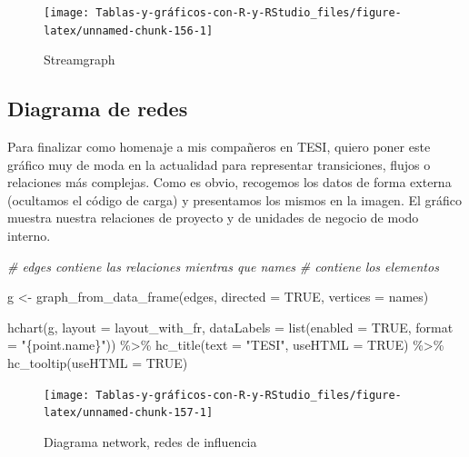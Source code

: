 \documentclass[
]{book}
\newenvironment{Shaded}{\begin{snugshade}}{\end{snugshade}}
\newcommand{\AttributeTok}[1]{\textcolor[rgb]{0.77,0.63,0.00}{#1}}
\newcommand{\CommentTok}[1]{\textcolor[rgb]{0.56,0.35,0.01}{\textit{#1}}}
\newcommand{\ConstantTok}[1]{\textcolor[rgb]{0.00,0.00,0.00}{#1}}
\newcommand{\FunctionTok}[1]{\textcolor[rgb]{0.00,0.00,0.00}{#1}}
\newcommand{\NormalTok}[1]{#1}
\newcommand{\OtherTok}[1]{\textcolor[rgb]{0.56,0.35,0.01}{#1}}
\newcommand{\SpecialCharTok}[1]{\textcolor[rgb]{0.00,0.00,0.00}{#1}}
\newcommand{\StringTok}[1]{\textcolor[rgb]{0.31,0.60,0.02}{#1}}
\begin{document}
\begin{figure}[H]

{\centering \texttt{[image: Tablas-y-gráficos-con-R-y-RStudio\_files/figure-latex/unnamed-chunk-156-1]} 

}

\caption{Streamgraph}\label{fig:unnamed-chunk-156}
\end{figure}

\hypertarget{diagrama-de-redes}{%
\subsection{Diagrama de redes}\label{diagrama-de-redes}}

Para finalizar como homenaje a mis compañeros en TESI, quiero poner este gráfico muy de moda en la actualidad para representar transiciones, flujos o relaciones más complejas. Como es obvio, recogemos los datos de forma externa (ocultamos el código de carga) y presentamos los mismos en la imagen. El gráfico muestra nuestra relaciones de proyecto y de unidades de negocio de modo interno.

\begin{Shaded}
\begin{Highlighting}[]
\CommentTok{\# edges contiene las relaciones mientras que names}
\CommentTok{\# contiene los elementos}

\NormalTok{g }\OtherTok{\textless{}{-}} \FunctionTok{graph\_from\_data\_frame}\NormalTok{(edges, }\AttributeTok{directed =} \ConstantTok{TRUE}\NormalTok{, }\AttributeTok{vertices =}\NormalTok{ names)}

\FunctionTok{hchart}\NormalTok{(g, }\AttributeTok{layout =}\NormalTok{ layout\_with\_fr, }\AttributeTok{dataLabels =} \FunctionTok{list}\NormalTok{(}\AttributeTok{enabled =} \ConstantTok{TRUE}\NormalTok{, }
  \AttributeTok{format =} \StringTok{"\{point.name\}"}\NormalTok{)) }\SpecialCharTok{\%\textgreater{}\%} \FunctionTok{hc\_title}\NormalTok{(}\AttributeTok{text =} \StringTok{"TESI"}\NormalTok{, }
  \AttributeTok{useHTML =} \ConstantTok{TRUE}\NormalTok{) }\SpecialCharTok{\%\textgreater{}\%} \FunctionTok{hc\_tooltip}\NormalTok{(}\AttributeTok{useHTML =} \ConstantTok{TRUE}\NormalTok{)}
\end{Highlighting}
\end{Shaded}

\begin{figure}[H]

{\centering \texttt{[image: Tablas-y-gráficos-con-R-y-RStudio\_files/figure-latex/unnamed-chunk-157-1]} 

}

\caption{Diagrama network, redes de influencia}\label{fig:unnamed-chunk-157}
\end{figure}
\end{document}
